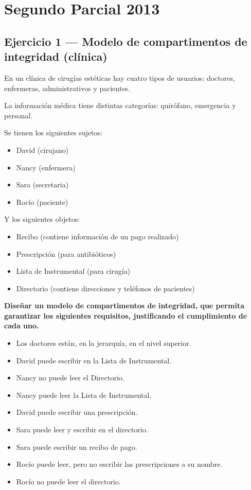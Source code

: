 \section{Segundo Parcial 2013}

\subsection{Ejercicio 1 — Modelo de compartimentos de integridad (clínica)}

\begin{consigna}
En un clínica de cirugías estéticas hay cuatro tipos de usuarios: doctores, enfermeras,
administrativos y pacientes.

La información médica tiene distintas categorías: quirófano, emergencia y personal.

Se tienen los siguientes sujetos:
\begin{itemize}
  \item David (cirujano)
  \item Nancy (enfermera)
  \item Sara (secretaria)
  \item Rocío (paciente)
\end{itemize}
Y los siguientes objetos:
\begin{itemize}
  \item Recibo (contiene información de un pago realizado)
  \item Prescripción (para antibióticos)
  \item Lista de Instrumental (para cirugía)
  \item Directorio (contiene direcciones y teléfonos de pacientes)
\end{itemize}

\textbf{Diseñar un modelo de compartimentos de integridad, que permita garantizar los
siguientes requisitos, justificando el cumplimiento de cada uno.}
\begin{itemize}
  \item Los doctores están, en la jerarquía, en el nivel superior.
  \item David puede escribir en la Lista de Instrumental.
  \item Nancy no puede leer el Directorio.
  \item Nancy puede leer la Lista de Instrumental.
  \item David puede escribir una prescripción.
  \item Sara puede leer y escribir en el directorio.
  \item Sara puede escribir un recibo de pago.
  \item Rocío puede leer, pero no escribir las prescripciones a su nombre.
  \item Rocío no puede leer el directorio.
\end{itemize}
\end{consigna}

